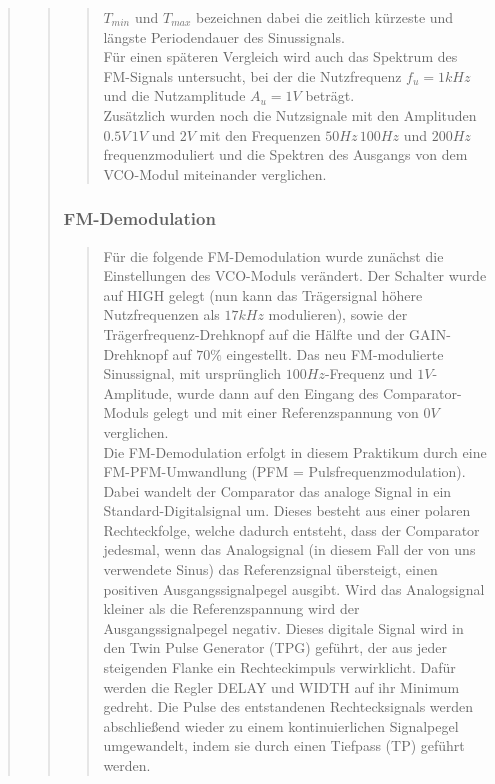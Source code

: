 \begin{quote}
\begin{quote}
\begin{quote}
   		$T_{min}$ und $T_{max}$ bezeichnen dabei die zeitlich kürzeste und längste
   		Periodendauer des Sinussignals.\\
   		Für einen späteren Vergleich wird auch das Spektrum des FM-Signals
   		untersucht, bei der die Nutzfrequenz $f_u = 1 kHz$ und die Nutzamplitude
   		$A_u = 1 V$ beträgt.\\
   		Zusätzlich wurden noch die Nutzsignale mit den Amplituden $0.5 V\, 1 V$ und
   		$2 V$ mit den Frequenzen $50 Hz\, 100 Hz$ und $200 Hz$ frequenzmoduliert
   		und die Spektren des Ausgangs von dem VCO-Modul miteinander verglichen. 
        \end{quote}
        
        \subsubsection{FM-Demodulation}
        \begin{quote}
        Für die folgende FM-Demodulation wurde zunächst die Einstellungen des
        VCO-Moduls verändert. Der Schalter wurde auf HIGH gelegt (nun kann das
        Trägersignal höhere Nutzfrequenzen als $17 kHz$ modulieren), sowie der
        Trägerfrequenz-Drehknopf auf die Hälfte und der GAIN-Drehknopf auf $70
        \%$ eingestellt. Das neu FM-modulierte Sinussignal, mit ursprünglich
        $100 Hz$-Frequenz und $1 V$-Amplitude, wurde dann auf den Eingang des
        Comparator-Moduls gelegt und mit einer Referenzspannung von $0 V$
        verglichen.\\
        
        Die FM-Demodulation erfolgt in diesem Praktikum durch eine
        FM-PFM-Umwandlung (PFM = Pulsfrequenzmodulation). Dabei wandelt der
        Comparator das analoge Signal in ein Standard-Digitalsignal um. Dieses
        besteht aus einer polaren Rechteckfolge, welche dadurch entsteht, dass
        der Comparator jedesmal, wenn das Analogsignal (in diesem Fall der
        von uns verwendete Sinus) das Referenzsignal übersteigt, einen positiven
        Ausgangssignalpegel ausgibt. Wird das Analogsignal kleiner als die
        Referenzspannung wird der Ausgangssignalpegel negativ. Dieses digitale
        Signal wird in den Twin Pulse Generator (TPG) geführt, der aus jeder
        steigenden Flanke ein Rechteckimpuls verwirklicht. Dafür werden die
        Regler DELAY und WIDTH auf ihr Minimum gedreht. Die Pulse des
        entstandenen Rechtecksignals werden abschließend wieder zu einem kontinuierlichen 
        Signalpegel umgewandelt, indem sie durch einen Tiefpass
        (TP) geführt werden.\\
        

\end{quote}
\end{quote}
\end{quote}
